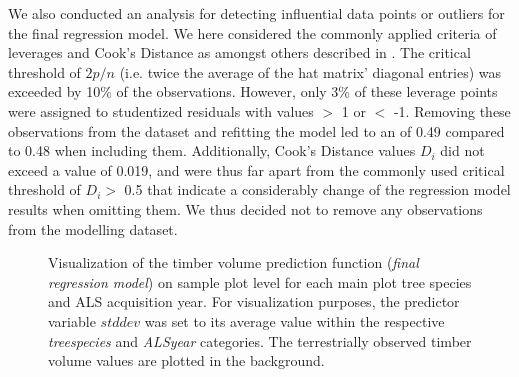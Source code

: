 We also conducted an analysis for detecting influential data points or outliers for the final regression model. We here considered the commonly applied criteria of leverages and Cook's Distance as amongst others described in \citet[p. 160-167]{fahrmeir2013}. The critical threshold of $2p/n$ (i.e. twice the average of the hat matrix' diagonal entries) was exceeded by 10\% of the observations. However, only 3\% of these leverage points were assigned to studentized residuals with values $>$ 1 or $<$ -1. Removing these observations from the dataset and refitting the model led to an \adjrsq{} of 0.49 compared to 0.48 when including them. Additionally, Cook's Distance values $D_i$ did not exceed a value of 0.019, and were thus far apart from the commonly used critical threshold of $D_i >$ 0.5 that indicate a considerably change of the regression model results when omitting them. We thus decided not to remove any observations from the modelling dataset.

\begin{figure}[h]
	\centering
	\caption{Visualization of the timber volume prediction function (\textit{final regression model}) on sample plot level for each main plot tree species and ALS acquisition year. For visualization purposes, the predictor variable $stddev$ was set to its average value within the respective \textit{treespecies} and \textit{ALSyear} categories. The terrestrially observed timber volume values are plotted in the background.}
	\label{fig:predlines_tspec}
\end{figure}



